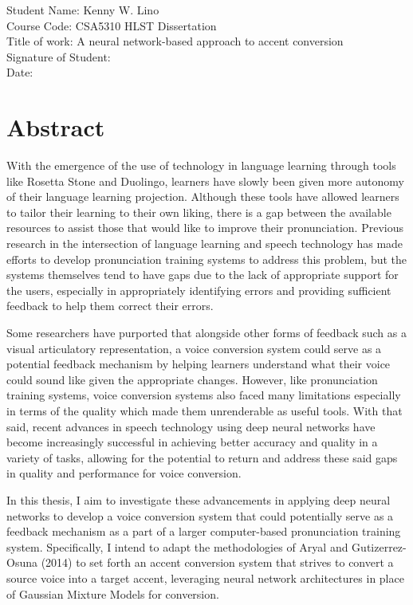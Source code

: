\documentclass
[
    a4paper,
    twoside,
    12pt
]
{report}
\begin{document}
       \vspace*{1.5cm}
	     Student Name: Kenny W. Lino \\
       Course Code: CSA5310 HLST Dissertation \\
       Title of work: A neural network-based approach to accent conversion \\

       \vspace*{1.0cm}
       Signature of Student: \\

       \vspace*{1.0cm}
       Date:

\newpage
\section*{Abstract}

With the emergence of the use of technology in language learning through
tools like Rosetta Stone and Duolingo, learners have slowly been given
more autonomy of their language learning projection. Although these
tools have allowed learners to tailor their learning to their own
liking, there is a gap between the available resources to assist those
that would like to improve their pronunciation. Previous research in the
intersection of language learning and speech technology has made efforts
to develop pronunciation training systems to address this problem, but
the systems themselves tend to have gaps due to the lack of appropriate
support for the users, especially in appropriately identifying errors
and providing sufficient feedback to help them correct their errors.

Some researchers have purported that alongside other forms of feedback
such as a visual articulatory representation, a voice conversion system
could serve as a potential feedback mechanism by helping learners
understand what their voice could sound like given the appropriate
changes. However, like pronunciation training systems, voice conversion
systems also faced many limitations especially in terms of the quality
which made them unrenderable as useful tools. With that said, recent
advances in speech technology using deep neural networks have become
increasingly successful in achieving better accuracy and quality in a
variety of tasks, allowing for the potential to return and address these
said gaps in quality and performance for voice conversion.

In this thesis, I aim to investigate these advancements in applying deep
neural networks to develop a voice conversion system that could
potentially serve as a feedback mechanism as a part of a larger
computer-based pronunciation training system. Specifically, I intend to
adapt the methodologies of Aryal and Gutizerrez-Osuna (2014) to set
forth an accent conversion system that strives to convert a source voice
into a target accent, leveraging neural network architectures in place
of Gaussian Mixture Models for conversion.
\cleardoublepage
\tableofcontents
{}
\clearpage
\listoffigures
{}
\end{document}
